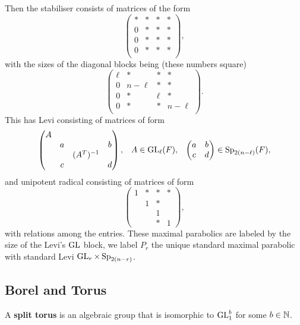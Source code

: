     Then the stabiliser consists of matrices of the form
    \[\begin{pmatrix}
        * &*&*&* \\
        0 &*&*&* \\
        0 &*&*&* \\
        0 &*&*&* \\
    \end{pmatrix},\]
    with the sizes of the diagonal blocks being (these numbers square)
    \[\begin{pmatrix}
        \ell &*&*&* \\
        0 &n-\ell&*&* \\
        0 &*&\ell&* \\
        0 &*&*&n-\ell \\
    \end{pmatrix}.\]
    This has Levi consisting of matrices of form 
    \[\begin{pmatrix}
        A &&& \\
         &a&&b \\
         &&(A^T)^{-1}& \\
         &c&&d \\
    \end{pmatrix}, \;\;\; A\in \operatorname{GL}_\ell(F), \;\;\; \begin{pmatrix}
        a & b\\
        c & d \\
    \end{pmatrix} \in \operatorname{Sp}_{2(n-\ell)}(F),\]
    and unipotent radical consisting of matrices of form 
    \[\begin{pmatrix}
        1 &*&*&* \\
        & 1&*& \\
        && 1& \\
        &&*&1
    \end{pmatrix},\]
    with relations among the entries. These maximal parabolics are labeled by the size of the Levi's \(\operatorname{GL}\) block, we label \(P_r\) the unique standard maximal parabolic with standard Levi \(\operatorname{GL}_r \times \operatorname{Sp}_{2(n-r)}\).\label{max-parabolic} 


    \subsection{Borel and Torus}\label{borel_torus}    
    A \textbf{split torus} is an algebraic group that is isomorphic to \(\operatorname{GL}_1^b\) for some \(b\in\N\).

